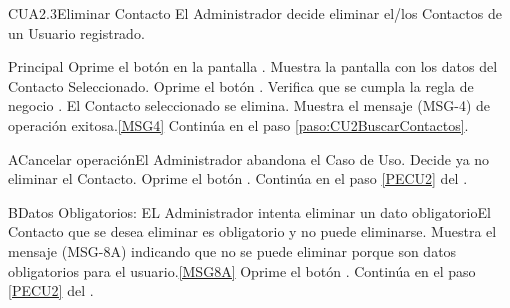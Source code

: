 	\begin{UseCase}{CUA2.3}{Eliminar Contacto }{El Administrador decide eliminar el/los Contactos de un Usuario registrado.}
	\end{UseCase}

	\begin{UCtrayectoria}{Principal}
			\UCpaso[\UCactor] Oprime el botón  en la pantalla .
			\UCpaso Muestra la pantalla  con los datos del Contacto Seleccionado. 
			\UCpaso [\UCactor] Oprime el botón . 
			\UCpaso Verifica que se cumpla la regla de negocio . 
			\UCpaso El Contacto seleccionado se elimina.
			\UCpaso Muestra el mensaje (MSG-4) de operación exitosa.\ref{MSG4}
			\UCpaso Continúa en el paso \ref{paso:CU2BuscarContactos}.
	\end{UCtrayectoria}

		\begin{UCtrayectoriaA}{A}{Cancelar operación}{El Administrador abandona el Caso de Uso.}
			\UCpaso[\UCactor] Decide ya no eliminar el Contacto. \label{Datos_Asoc_Contactos}
			\UCpaso[\UCactor] Oprime el botón .
			\UCpaso Continúa en el paso \ref{PECU2} del .
		\end{UCtrayectoriaA}

		\begin{UCtrayectoriaA}{B}{Datos Obligatorios: EL Administrador intenta eliminar un dato obligatorio}{El Contacto que se desea eliminar es obligatorio y no puede eliminarse.}
			\UCpaso Muestra el mensaje (MSG-8A) indicando que no se puede eliminar porque son datos obligatorios para el usuario.\ref{MSG8A}
			\UCpaso [\UCactor] Oprime el botón .
			\UCpaso Continúa en el paso \ref{PECU2} del .
		\end{UCtrayectoriaA}
